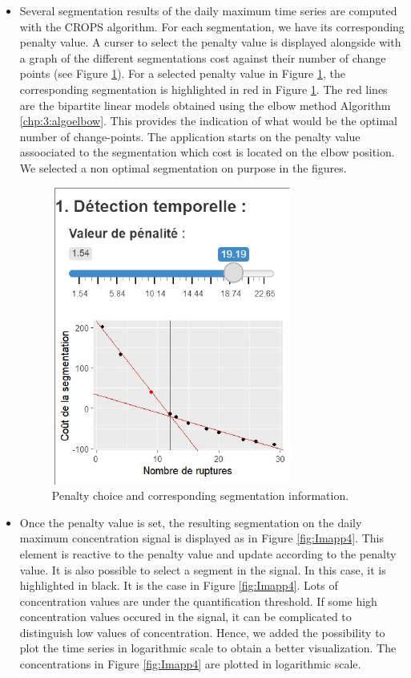 \begin{itemize}
\item Several segmentation results of the daily maximum time series are computed with the CROPS algorithm. For each segmentation, we have its corresponding penalty value. A curser to select the penalty value is displayed alongside with a graph of the different segmentations cost against their number of change points (see Figure \ref{fig:Imapp3}). For a selected penalty value in Figure \ref{fig:Imapp3}, the corresponding segmentation is highlighted in red in Figure \ref{fig:Imapp3}. The red lines are the bipartite linear models obtained using the elbow method Algorithm \ref{chp:3:algoelbow}. This provides the indication of what would be the optimal number of change-points. The application starts on the penalty value assoociated to the segmentation which cost is located on the elbow position. We selected a non optimal segmentation on purpose in the figures. 
\begin{figure}[ht]
  \centering
  \includegraphics[]{figs/Chap6/Im_app3.pdf}
  \caption{Penalty choice and corresponding segmentation information.}
  \label{fig:Imapp3}
\end{figure}
\item Once the penalty value is set, the resulting segmentation on the daily maximum concentration signal is displayed as in Figure \ref{fig:Imapp4}. This element is reactive to the penalty value and update according to the penalty value. It is also possible to select a segment in the signal. In this case, it is highlighted in black. It is the case in Figure \ref{fig:Imapp4}. Lots of concentration values are under the quantification threshold. If some high concentration values occured in the signal, it can be complicated to distinguish low values of concentration. Hence, we added the possibility to plot the time series in logarithmic scale to obtain a better visualization. The concentrations in Figure \ref{fig:Imapp4} are plotted in logarithmic scale.  

\end{itemize}
